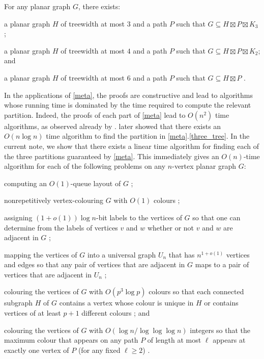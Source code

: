 \documentclass{patmorin}
\begin{document}
\begin{thm}\label{meta}
  For any planar graph $G$, there exists:
  \begin{compactenum}[(a)]
    \item \label{three_tree} a planar graph $H$ of treewidth at most $3$ and a path $P$ such that $G\subseteq H\boxtimes P\boxtimes K_3$ \cite{dujmovic.joret.ea:planar};
    \item \label{four_tree} a planar graph $H$ of treewidth at most $4$ and a path $P$ such that $G\subseteq H\boxtimes P\boxtimes K_2$; and
    \item \label{six_tree} a planar graph $H$ of treewidth at most $6$ and a path $P$ such that $G\subseteq H\boxtimes P$ \cite{ueckerdt.wood.ea:improved}.
  \end{compactenum}
\end{thm}

In the applications of \cref{meta}, the proofs are constructive and lead to algorithms whose running time is dominated by the time required to compute the relevant partition. Indeed, the proofs of each part of \cref{meta} lead to $O(n^2)$ time algorithms, as observed already by \citet{dujmovic.joret.ea:planar}.  \citet{morin:fast} later showed that there exists an $O(n\log n)$ time algorithm to find the partition in \cref{meta}.\ref{three_tree}.  In the current note, we show that there exists a linear time algorithm for finding each of the three partitions guaranteed by \cref{meta}.  This immediately gives an $O(n)$-time algorithm for each of the following problems on any $n$-vertex planar graph $G$:
\begin{compactitem}
  \item computing an $O(1)$-queue layout of $G$ \cite{dujmovic.joret.ea:planar};
  \item nonrepetitively vertex-colouring $G$ with $O(1)$ colours \cite{dujmovic.esperet.ea:planar};
  \item assigning $(1+o(1))\log n$-bit labels to the vertices of $G$ so that one can determine from the labels of vertices $v$ and $w$ whether or not $v$ and $w$ are adjacent in $G$ \cite{dujmovic.esperet.ea:adjacency};
  \item mapping the vertices of $G$ into a universal graph $U_n$ that has $n^{1+o(1)}$ vertices and edges so that any pair of vertices that are adjacent in $G$ maps to a pair of vertices that are adjacent in $U_n$ \cite{esperet.joret.ea:sparse};
  \item colouring the vertices of $G$ with $O(p^3\log p)$ colours so that each connected subgraph $H$ of $G$ contains a vertex whose colour is unique in $H$ or contains vertices of at least $p+1$ different colours \cite{debski.felsner.ea:improved}; and
  \item colouring the vertices of $G$ with $O(\log n/\log\log\log n)$ integers so that the maximum colour that appears on any path $P$ of length at most $\ell$ appears at exactly one vertex of $P$ (for any fixed $\ell\ge 2$) \cite{bose.dujmovic.ea:asymptotically}.
\end{compactitem}
\end{document}
